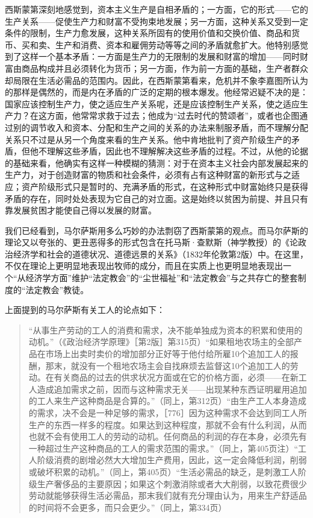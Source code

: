 西斯蒙第深刻地感觉到，资本主义生产是自相矛盾的；一方面，它的形式——它的生产关系——促使生产力和财富不受拘束地发展；另一方面，这种关系又受到一定条件的限制，生产力愈发展，这种关系所固有的使用价值和交换价值、商品和货币、买和卖、生产和消费、资本和雇佣劳动等等之间的矛盾就愈扩大。他特别感觉到了这样一个基本矛盾：一方面是生产力的无限制的发展和财富的增加——同时财富由商品构成并且必须转化为货币；另一方面，作为前一方面的基础，生产者群众却局限在生活必需品的范围内。因此，在西斯蒙第看来，危机并不象李嘉图所认为的那样是偶然的，而是内在矛盾的广泛的定期的根本爆发。他经常迟疑不决的是：国家应该控制生产力，使之适应生产关系呢，还是应该控制生产关系，使之适应生产力？在这方面，他常常求救于过去；他成为“过去时代的赞颂者”，或者也企图通过别的调节收入和资本、分配和生产之间的关系的办法来制服矛盾，而不理解分配关系只不过是从另一个角度来看的生产关系。他中肯地批判了资产阶级生产的矛盾，但他不理解这些矛盾，因此也不理解解决这些矛盾的过程。不过，从他的论据的基础来看，他确实有这样一种模糊的猜测：对于在资本主义社会内部发展起来的生产力，对于创造财富的物质和社会条件，必须有占有这种财富的新形式与之适应；资产阶级形式只是暂时的、充满矛盾的形式，在这种形式中财富始终只是获得矛盾的存在，同时处处表现为它自己的对立面。这是始终以贫困为前提、并且只有靠发展贫困才能使自己得以发展的财富。

我们已经看到，马尔萨斯用多么巧妙的办法剽窃了西斯蒙第的观点。而马尔萨斯的理论又以夸张的、更丑恶得多的形式包含在托马斯·查默斯（神学教授）的《论政治经济学和社会的道德状况、道德远景的关系》（1832年伦敦第2版）中。在这里，不仅在理论上更明显地表现出牧师的成分，而且在实质上也更明显地表现出一个“从经济学方面”维护“法定教会”的“尘世福祉”和“法定教会”与之共存亡的整套制度的“法定教会”教徒。

上面提到的马尔萨斯有关工人的论点如下：

\begin{quote}{“从事生产劳动的工人的消费和需求，决不能单独成为资本的积累和使用的动机。”（《政治经济学原理》［第2版］第315页）“如果租地农场主的全部产品在市场上出卖时卖价的增加部分正好等于他付给所雇10个追加工人的报酬，那末，就没有一个租地农场主会自找麻烦去监督这10个追加工人的劳动。在有关商品的过去的供求状况方面或在它的价格方面，必须——在新工人造成追加需求之前，因而与这种需求无关——出现某种东西证明雇用追加的工人来生产这种商品是合算的。”（同上，第312页）“由生产工人本身造成的需求，决不会是一种足够的需求，［776］因为这种需求不会达到同工人所生产的东西一样多的程度。如果达到这种程度，那就不会有什么利润，从而也就不会有使用工人的劳动的动机。任何商品的利润的存在本身，必须先有一种超过生产这种商品的工人的需求范围的需求。”（同上，第405页注）“工人阶级消费的剧增必然大大增加生产费用，因此，这一定会降低利润，削弱或破坏积累的动机。”（同上，第405页）“生活必需品的缺乏，是刺激工人阶级生产奢侈品的主要原因；如果这个刺激消除或者大大削弱，以致花费很少劳动就能够获得生活必需品，那末我们就有充分理由认为，用来生产舒适品的时间将不会更多，而只会更少。”（同上，第334页）}\end{quote}

